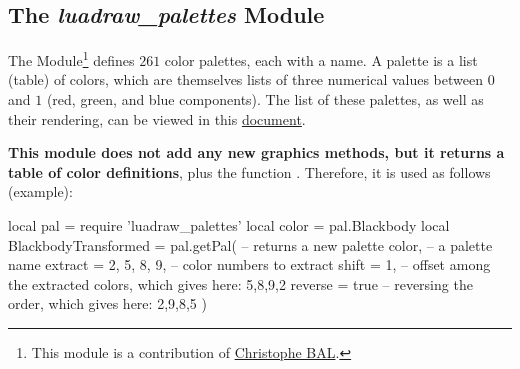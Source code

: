 \subsection{The \emph{luadraw\_palettes} Module}

The  Module\footnote{This module is a contribution of \href{https://github.com/projetmbc/for-writing/tree/main/@prism}{Christophe BAL}.} defines $261$ color palettes, each with a name. A palette is a list (table) of colors, which are themselves lists of three numerical values ​​between $0$ and $1$ (red, green, and blue components). The list of these palettes, as well as their rendering, can be viewed in this \href{luadraw_palettes_list.pdf}{document}.

\textbf{This module does not add any new graphics methods, but it returns a table of color definitions}, plus the function . Therefore, it is used as follows (example):

\begin{Luacode}
local pal = require 'luadraw_palettes'
local color = pal.Blackbody
local BlackbodyTransformed = pal.getPal( -- returns a new palette
    color, -- a palette name
    {
    extract = {2, 5, 8, 9}, -- color numbers to extract
    shift = 1, -- offset among the extracted colors, which gives here: 5,8,9,2
    reverse = true -- reversing the order, which gives here: 2,9,8,5
    }
)
\end{Luacode}
